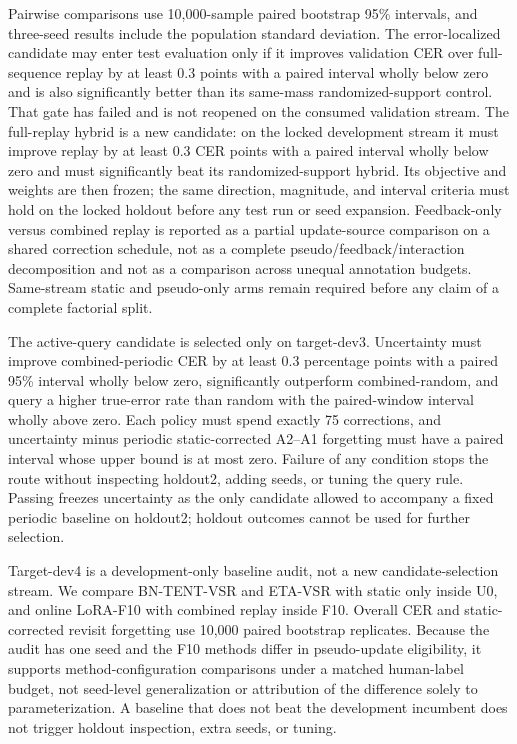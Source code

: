 Pairwise comparisons use 10,000-sample paired bootstrap 95\% intervals, and three-seed results include the population standard deviation. The error-localized candidate may enter test evaluation only if it improves validation CER over full-sequence replay by at least 0.3 points with a paired interval wholly below zero and is also significantly better than its same-mass randomized-support control. That gate has failed and is not reopened on the consumed validation stream. The full-replay hybrid is a new candidate: on the locked development stream it must improve replay by at least 0.3 CER points with a paired interval wholly below zero and must significantly beat its randomized-support hybrid. Its objective and weights are then frozen; the same direction, magnitude, and interval criteria must hold on the locked holdout before any test run or seed expansion. Feedback-only versus combined replay is reported as a partial update-source comparison on a shared correction schedule, not as a complete pseudo/feedback/interaction decomposition and not as a comparison across unequal annotation budgets. Same-stream static and pseudo-only arms remain required before any claim of a complete factorial split.

The active-query candidate is selected only on target-dev3. Uncertainty must improve combined-periodic CER by at least 0.3 percentage points with a paired 95\% interval wholly below zero, significantly outperform combined-random, and query a higher true-error rate than random with the paired-window interval wholly above zero. Each policy must spend exactly 75 corrections, and uncertainty minus periodic static-corrected A2--A1 forgetting must have a paired interval whose upper bound is at most zero. Failure of any condition stops the route without inspecting holdout2, adding seeds, or tuning the query rule. Passing freezes uncertainty as the only candidate allowed to accompany a fixed periodic baseline on holdout2; holdout outcomes cannot be used for further selection.

Target-dev4 is a development-only baseline audit, not a new candidate-selection stream. We compare BN-TENT-VSR and ETA-VSR with static only inside U0, and online LoRA-F10 with combined replay inside F10. Overall CER and static-corrected revisit forgetting use 10,000 paired bootstrap replicates. Because the audit has one seed and the F10 methods differ in pseudo-update eligibility, it supports method-configuration comparisons under a matched human-label budget, not seed-level generalization or attribution of the difference solely to parameterization. A baseline that does not beat the development incumbent does not trigger holdout inspection, extra seeds, or tuning.

